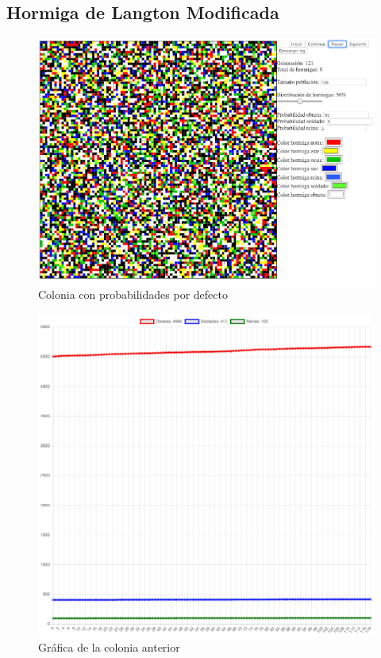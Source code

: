 	\subsection{Hormiga de Langton Modificada}
		\begin{figure}[H]
			\begin{center}
				\includegraphics[scale=.3]{HL/img/mod1-1.png}
				\caption{Colonia con probabilidades por defecto}
				\label{fig:hl1}
			\end{center}
		\end{figure}

		\begin{figure}[H]
			\begin{center}
				\includegraphics[scale=.24]{HL/img/mod1-2.png}
				\caption{Gráfica de la colonia anterior}
				\label{fig:hl1}
			\end{center}
		\end{figure}

